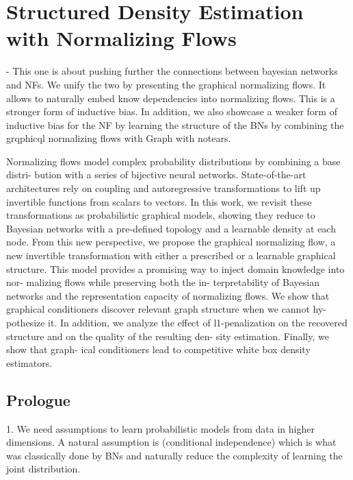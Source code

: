 

\chapter{Structured Density Estimation with Normalizing Flows}\label{ch:06}

\begin{chapter_outline}
- This one is about pushing further the connections between bayesian networks and NFs. We unify the two by presenting the graphical normalizing flows. It allows to naturally embed know dependencies into normalizing flows. This is a stronger form of inductive bias. In addition, we also showcase a weaker form of inductive bias for the NF by learning the structure of the BNs by combining the grqphicql normalizing flows with Graph with notears.

Normalizing flows model complex probability distributions by combining a base distri- bution with a series of bijective neural networks. State-of-the-art architectures rely on coupling and autoregressive transformations to lift up invertible functions from scalars to vectors. In this work, we revisit these transformations as probabilistic graphical models, showing they reduce to Bayesian networks with a pre-defined topology and a learnable density at each node. From this new perspective, we propose the graphical normalizing flow, a new invertible transformation with either a prescribed or a learnable graphical structure. This model provides a promising way to inject domain knowledge into nor- malizing flows while preserving both the in- terpretability of Bayesian networks and the representation capacity of normalizing flows. We show that graphical conditioners discover relevant graph structure when we cannot hy- pothesize it. In addition, we analyze the effect of l1-penalization on the recovered structure and on the quality of the resulting den- sity estimation. Finally, we show that graph- ical conditioners lead to competitive white box density estimators.
\end{chapter_outline}

\section{Prologue}

1. We need assumptions to learn probabilistic models from data in higher dimensions. A natural assumption is (conditional independence) which is what was classically done by BNs and naturally reduce the complexity of learning the joint distribution.

